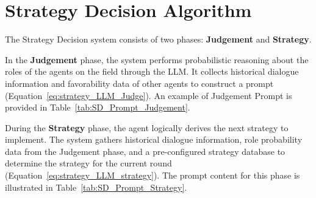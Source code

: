 \section{Strategy Decision Algorithm} \label{sec:Appendix_Strategy_Decision}


The Strategy Decision system consists of two phases: \textbf{Judgement} and \textbf{Strategy}. 

In the \textbf{Judgement} phase, the system performs probabilistic reasoning about the roles of the agents on the field through the LLM. It collects historical dialogue information and favorability data of other agents to construct a prompt (Equation~\ref{eq:strategy_LLM_Judge}). An example of Judgement Prompt is provided in Table~\ref{tab:SD_Prompt_Judgement}. 

During the \textbf{Strategy} phase, the agent logically derives the next strategy to implement. The system gathers historical dialogue information, role probability data from the Judgement phase, and a pre-configured strategy database to determine the strategy for the current round (Equation~\ref{eq:strategy_LLM_strategy}). The prompt content for this phase is illustrated in Table~\ref{tab:SD_Prompt_Strategy}.


